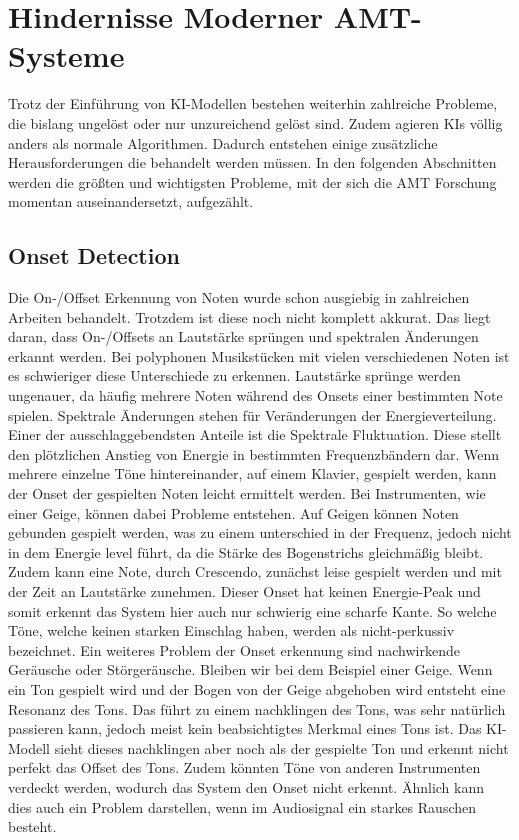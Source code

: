 \section{Hindernisse Moderner AMT-Systeme}
Trotz der Einführung von KI-Modellen bestehen weiterhin zahlreiche Probleme,
die bislang ungelöst oder nur unzureichend gelöst sind.
Zudem agieren KIs völlig anders als normale Algorithmen.
Dadurch entstehen einige zusätzliche Herausforderungen die behandelt werden müssen.
In den folgenden Abschnitten werden die größten und wichtigsten Probleme,
mit der sich die AMT Forschung momentan auseinandersetzt, aufgezählt.

\subsection{Onset Detection}\label{subsec:onset}
Die On-/Offset Erkennung von Noten wurde schon ausgiebig in zahlreichen Arbeiten behandelt.
Trotzdem ist diese noch nicht komplett akkurat.
Das liegt daran, dass On-/Offsets an Lautstärke sprüngen und spektralen Änderungen erkannt werden.
Bei polyphonen Musikstücken mit vielen verschiedenen Noten ist es schwieriger diese Unterschiede zu erkennen.
Lautstärke sprünge werden ungenauer, da häufig mehrere Noten während des Onsets einer bestimmten Note spielen.
Spektrale Änderungen stehen für Veränderungen der Energieverteilung.
Einer der ausschlaggebendsten Anteile ist die Spektrale Fluktuation.
Diese stellt den plötzlichen Anstieg von Energie in bestimmten Frequenzbändern dar.
Wenn mehrere einzelne Töne hintereinander, auf einem Klavier, gespielt werden, kann der Onset der gespielten Noten leicht ermittelt werden.
Bei Instrumenten, wie einer Geige, können dabei Probleme entstehen.
Auf Geigen können Noten gebunden gespielt werden, was zu einem unterschied in der Frequenz,
jedoch nicht in dem Energie level führt, da die Stärke des Bogenstrichs gleichmäßig bleibt.
Zudem kann eine Note, durch Crescendo, zunächst leise gespielt werden und mit der Zeit an Lautstärke zunehmen.
Dieser Onset hat keinen Energie-Peak und somit erkennt das System hier auch nur schwierig eine scharfe Kante.
So welche Töne, welche keinen starken Einschlag haben, werden als nicht-perkussiv bezeichnet.
Ein weiteres Problem der Onset erkennung sind nachwirkende Geräusche oder Störgeräusche.
Bleiben wir bei dem Beispiel einer Geige.
Wenn ein Ton gespielt wird und der Bogen von der Geige abgehoben wird entsteht eine Resonanz des Tons.
Das führt zu einem nachklingen des Tons, was sehr natürlich passieren kann,
jedoch meist kein beabsichtigtes Merkmal eines Tons ist.
Das KI-Modell sieht dieses nachklingen aber noch als der gespielte Ton und erkennt nicht perfekt das Offset des Tons.
Zudem könnten Töne von anderen Instrumenten verdeckt werden, wodurch das System den Onset nicht erkennt.
Ähnlich kann dies auch ein Problem darstellen, wenn im Audiosignal ein starkes Rauschen besteht.

